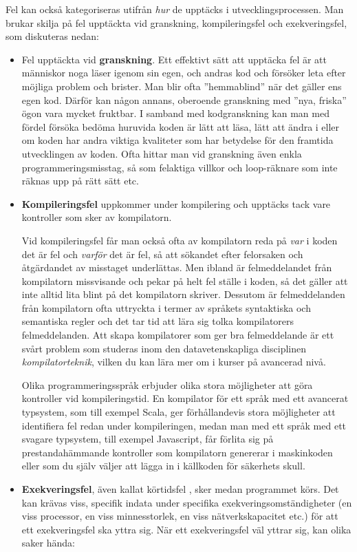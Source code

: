Fel kan också kategoriseras utifrån \emph{hur} de upptäcks i utvecklingsprocessen. Man brukar skilja på fel upptäckta vid granskning, kompileringsfel och exekveringsfel, som diskuteras nedan:
\begin{itemize}
\item Fel upptäckta vid \textbf{granskning}. Ett effektivt sätt att upptäcka fel är att människor noga läser igenom sin egen, och andras kod och försöker leta efter möjliga problem och brister. Man blir ofta ''hemmablind'' när det gäller ens egen kod. Därför kan någon annans, oberoende granskning med ''nya, friska'' ögon vara mycket fruktbar.  I samband med kodgranskning kan man med fördel försöka bedöma  huruvida koden är lätt att läsa, lätt att ändra i eller om koden har andra viktiga kvaliteter som har betydelse för den framtida utvecklingen av koden. Ofta hittar man vid granskning även enkla programmeringsmisstag, så som felaktiga villkor och loop-räknare som inte räknas upp på rätt sätt etc.
  
\item \textbf{Kompileringsfel} uppkommer under kompilering och upptäcks tack vare kontroller som sker av  kompilatorn. 

Vid kompileringsfel får man också ofta av kompilatorn reda på \emph{var} i koden det är fel och \emph{varför} det är fel, så att sökandet efter felorsaken och åtgärdandet av misstaget underlättas. Men ibland är felmeddelandet från kompilatorn missvisande och pekar på helt fel ställe i koden, så det gäller att inte alltid lita blint på det kompilatorn skriver. Dessutom är felmeddelanden från kompilatorn ofta uttryckta i termer av språkets syntaktiska och semantiska regler och det tar tid att lära sig tolka kompilatorers felmeddelanden. Att skapa kompilatorer som ger bra felmeddelande är ett svårt problem som studeras inom den datavetenskapliga disciplinen \textit{kompilatorteknik}, vilken du kan lära mer om i kurser på avancerad nivå.

Olika programmeringsspråk erbjuder olika stora möjligheter att göra kontroller vid kompileringstid. En kompilator för ett språk med ett avancerat typsystem, som till exempel Scala, ger förhållandevis stora möjligheter att identifiera fel redan under kompileringen, medan man med ett språk med ett svagare typsystem, till exempel Javascript, får förlita sig på prestandahämmande kontroller som kompilatorn genererar i maskinkoden eller som du själv väljer att lägga in i källkoden för säkerhets skull. 
  
\item \textbf{Exekveringsfel}, även kallat körtidsfel , sker medan programmet körs. Det kan krävas viss, specifik indata under specifika exekveringsomständigheter (en viss processor, en viss minnesstorlek, en viss nätverkskapacitet etc.) för att ett exekveringsfel ska yttra sig. När ett exekveringsfel väl yttrar sig, kan olika saker hända:


\end{itemize}
